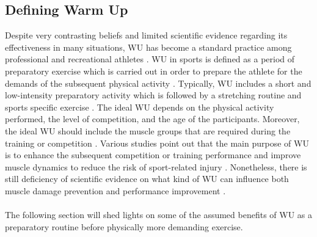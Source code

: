 \subsection{Defining Warm Up}
Despite very contrasting beliefs and limited scientific evidence regarding its effectiveness in many situations, WU has become a standard practice among professional and recreational athletes \cite{bishop2003warm1, bishop2003warm2, shellock1985warming}. WU in sports is defined as a period of preparatory exercise which is carried out in order to prepare the athlete for the demands of the subsequent physical activity  \cite{karvonen1992importance, woods2007warm, hedrick1992exercise}.
Typically, WU includes a short and low-intensity preparatory activity which is followed by a stretching routine and sports specific exercise \cite{safran1989warm}. 
The ideal WU depends on the physical activity performed,
the level of competition, and the age of the participants. Moreover, the ideal WU should include the muscle groups that are required during the training or competition
 \cite{mayr2015prevention}. Various studies point out that the main purpose of WU is to enhance the subsequent competition or training performance and improve muscle dynamics to reduce the risk of sport-related injury \cite{bishop2003warm1, shellock1985warming, knudson2008warm}. 
Nonetheless, there is still deficiency of scientific evidence on what kind of WU can influence both muscle damage prevention and performance improvement \cite{safran1989warm}.\\\\ The following section will shed lights on some of the assumed benefits of WU as a preparatory routine before physically more demanding exercise. 
